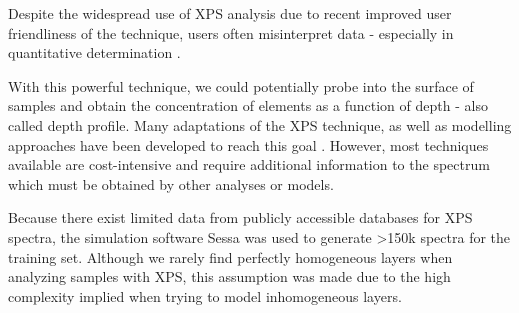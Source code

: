
Despite the widespread use of XPS analysis due to recent improved user friendliness of the technique, users often misinterpret data - especially in quantitative determination \cite{shard_practical_2020}. 





With this powerful technique, we could potentially probe into the surface of samples and obtain the concentration of elements as a function of depth - also called depth profile. Many adaptations of the XPS technique, as well as modelling approaches have been developed to reach this goal \cite{zemek_non-destructive_2019, zborowski_improved_2022, zborowski_comparison_2022, noauthor_energy_2010}. However, most techniques available are cost-intensive and require additional information to the spectrum which must be obtained by other analyses or models.  




Because there exist limited data from publicly accessible databases for XPS spectra, the simulation software Sessa was used to generate >150k spectra for the training set. Although we rarely find perfectly homogeneous layers when analyzing samples with XPS, this assumption was made due to the high complexity implied when trying to model inhomogeneous layers.


